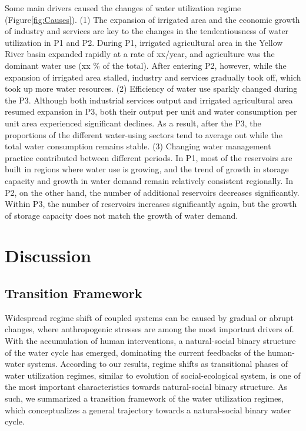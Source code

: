 \documentclass[9pt, twocolumn, twoside, lineno]{pnas-new}
\begin{document}
Some main drivers caused the changes of water utilization regime (Figure\ref{fig:Causes}).
(1) The expansion of irrigated area and the economic growth of industry and services are key to the
changes in the tendentiousness of water utilization in P1 and P2.
During P1, irrigated agricultural area in the Yellow River basin expanded rapidly at a rate of xx/year, 
and agriculture was the dominant water use (xx \% of the total).
After entering P2, however, while the expansion of irrigated area stalled, 
industry and services gradually took off, which took up more water resources.
(2) Efficiency of water use sparkly changed during the P3.
Although both industrial services output and irrigated agricultural area resumed expansion in P3, 
both their output per unit and water consumption per unit area experienced significant declines.
As a result, after the P3, the proportions of the different water-using sectors tend to average out 
while the total water consumption remains stable.
(3) Changing water management practice contributed between different periods.
In P1, most of the reservoirs are built in regions where water use is growing, 
and the trend of growth in storage capacity and growth in water demand remain relatively consistent regionally.
In P2, on the other hand, the number of additional reservoirs decreases significantly. 
Within P3, the number of reservoirs increases significantly again, 
but the growth of storage capacity does not match the growth of water demand.

\section*{Discussion}

\subsection*{Transition Framework}
Widespread regime shift of coupled systems can be caused by gradual or abrupt changes, 
where anthropogenic stresses are among the most important drivers of. 
With the accumulation of human interventions, 
a natural-social binary structure of the water cycle has emerged, 
dominating the current feedbacks of the human-water systems.
According to our results, 
regime shifts as transitional phases of water utilization regimes, 
similar to evolution of social-ecological system, 
is one of the most important characteristics towards natural-social binary structure.
As such, we summarized a transition framework of the water utilization regimes, which conceptualizes a general trajectory towards a natural-social binary water cycle.
\end{document}

